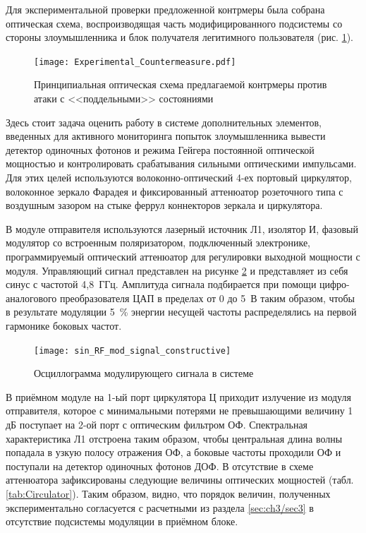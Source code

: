 Для экспериментальной проверки предложенной контрмеры была собрана оптическая схема, воспроизводящая часть модифицированного подсистемы со стороны злоумышленника и блок получателя легитимного пользователя (рис. \ref{fig:Experimental_countermeasure}). 


 \begin{figure}[ht]
  \centering
  \texttt{[image: Experimental\_Countermeasure.pdf]}
  \caption{Принципиальная оптическая схема предлагаемой контрмеры против атаки с <<поддельными>> состояниями}
  \label{fig:Experimental_countermeasure}
\end{figure}

Здесь стоит задача оценить работу в системе дополнительных элементов, введенных для активного мониторинга попыток злоумышленника вывести детектор одиночных фотонов и режима Гейгера постоянной оптической мощностью и контролировать срабатывания сильными оптическими импульсами. Для этих целей используются волоконно-оптический 4-ех портовый циркулятор, волоконное зеркало Фарадея и фиксированный аттенюатор розеточного типа с воздушным зазором на стыке феррул коннекторов зеркала и циркулятора. 

В модуле отправителя используются лазерный источник Л1, изолятор И, фазовый модулятор со встроенным поляризатором, подключенный электронике, программируемый оптический аттенюатор для регулировки выходной мощности с модуля. Управляющий сигнал представлен на рисунке \ref{fig:RF_sin_osc} и представляет из себя синус с частотой 4,8~ГГц. Амплитуда сигнала подбирается при помощи цифро-аналогового преобразователя ЦАП в пределах от 0 до 5~В таким образом, чтобы в результате модуляции 5~\% энергии несущей частоты распределялись на первой гармонике боковых частот.    


 \begin{figure}[ht]
  \centering
  \texttt{[image: sin\_RF\_mod\_signal\_constructive]}
  \caption{Осциллограмма модулирующего сигнала в системе}
  \label{fig:RF_sin_osc}
\end{figure}


В приёмном модуле на 1-ый порт циркулятора Ц приходит излучение из модуля отправителя, которое с минимальными потерями не превышающими величину 1 дБ поступает на 2-ой порт с оптическим фильтром ОФ. Спектральная характеристика Л1 отстроена таким образом, чтобы центральная длина волны попадала в узкую полосу отражения ОФ, а боковые частоты проходили ОФ и поступали на детектор одиночных фотонов ДОФ. В отсутствие в схеме аттенюатора зафиксированы следующие величины оптических мощностей (табл. \ref{tab:Circulator}). Таким образом, видно, что порядок величин, полученных экспериментально согласуется с расчетными из раздела \ref{sec:ch3/sec3} в отсутствие подсистемы модуляции в приёмном блоке. 


